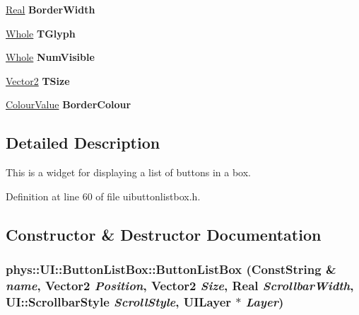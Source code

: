\begin{DoxyCompactItemize}
\item 
\hypertarget{classphys_1_1UI_1_1ButtonListBox_a84d6d689a273e77252f248c81bd1d670}{
\hyperlink{namespacephys_af7eb897198d265b8e868f45240230d5f}{Real} {\bfseries BorderWidth}}
\label{d4/dd7/classphys_1_1UI_1_1ButtonListBox_a84d6d689a273e77252f248c81bd1d670}

\item 
\hypertarget{classphys_1_1UI_1_1ButtonListBox_a4284fcee343ce2bbb178d560a5712e6b}{
\hyperlink{namespacephys_a460f6bc24c8dd347b05e0366ae34f34a}{Whole} {\bfseries TGlyph}}
\label{d4/dd7/classphys_1_1UI_1_1ButtonListBox_a4284fcee343ce2bbb178d560a5712e6b}

\item 
\hypertarget{classphys_1_1UI_1_1ButtonListBox_a9414e2009038dcd9dbb31464f63b563a}{
\hyperlink{namespacephys_a460f6bc24c8dd347b05e0366ae34f34a}{Whole} {\bfseries NumVisible}}
\label{d4/dd7/classphys_1_1UI_1_1ButtonListBox_a9414e2009038dcd9dbb31464f63b563a}

\item 
\hypertarget{classphys_1_1UI_1_1ButtonListBox_a3b2483012699ef522c592ecefb30a82a}{
\hyperlink{classphys_1_1Vector2}{Vector2} {\bfseries TSize}}
\label{d4/dd7/classphys_1_1UI_1_1ButtonListBox_a3b2483012699ef522c592ecefb30a82a}

\item 
\hypertarget{classphys_1_1UI_1_1ButtonListBox_abea496f1f59230f00ea03af54264804b}{
\hyperlink{classphys_1_1ColourValue}{ColourValue} {\bfseries BorderColour}}
\label{d4/dd7/classphys_1_1UI_1_1ButtonListBox_abea496f1f59230f00ea03af54264804b}

\end{DoxyCompactItemize}


\subsection{Detailed Description}
This is a widget for displaying a list of buttons in a box. 

Definition at line 60 of file uibuttonlistbox.h.



\subsection{Constructor \& Destructor Documentation}
\hypertarget{classphys_1_1UI_1_1ButtonListBox_a1360d155570a277a169b54a6c85ace0d}{
\subsubsection[{ButtonListBox}]{\setlength{\rightskip}{0pt plus 5cm}phys::UI::ButtonListBox::ButtonListBox ({\bf ConstString} \& {\em name}, \/  {\bf Vector2} {\em Position}, \/  {\bf Vector2} {\em Size}, \/  {\bf Real} {\em ScrollbarWidth}, \/  UI::ScrollbarStyle {\em ScrollStyle}, \/  {\bf UILayer} $\ast$ {\em Layer})}}
\label{d4/dd7/classphys_1_1UI_1_1ButtonListBox_a1360d155570a277a169b54a6c85ace0d}


